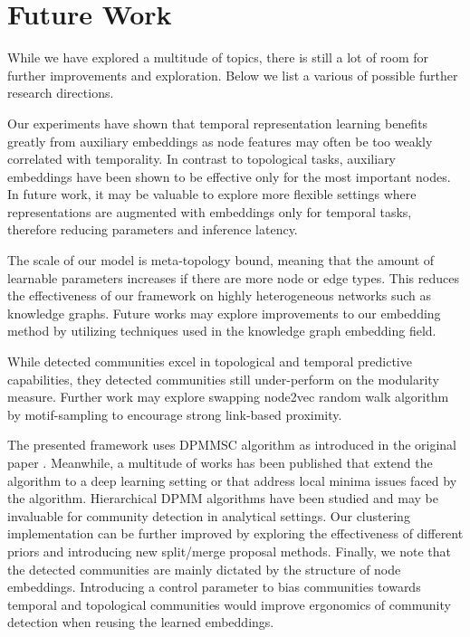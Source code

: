 \chapter{Future Work}
While we have explored a multitude of topics, there is still a lot of room for further improvements and exploration.
Below we list a various of possible further research directions.

Our experiments have shown that temporal representation learning benefits greatly from auxiliary embeddings as node features may often be too weakly correlated with temporality.
In contrast to topological tasks, auxiliary embeddings have been shown to be effective only for the most important nodes.
In future work, it may be valuable to explore more flexible settings where representations are augmented with embeddings only for temporal tasks, therefore reducing parameters and inference latency.

The scale of our model is meta-topology bound, meaning that the amount of learnable parameters increases if there are more node or edge types.
This reduces the effectiveness of our framework on highly heterogeneous networks such as knowledge graphs.
Future works may explore improvements to our embedding method by utilizing techniques used in the knowledge graph embedding field.

While detected communities excel in topological and temporal predictive capabilities, they detected communities still under-perform on the modularity measure.
Further work may explore swapping node2vec random walk algorithm by motif-sampling \cite{jiaCommunityGANCommunityDetection2019} to encourage strong link-based proximity.

The presented framework uses DPMMSC algorithm as introduced in the original paper \cite{changParallelSamplingDP2013a}. 
Meanwhile, a multitude of works has been published that extend the algorithm to a deep learning setting \cite{ronenDeepDPMDeepClustering2022} or that address local minima issues faced by the algorithm.
Hierarchical DPMM algorithms have been studied \cite{tehHierarchicalDirichletProcesses2006, changSamplingComputerVision} and may be invaluable for community detection in analytical settings.
Our clustering implementation can be further improved by exploring the effectiveness of different priors and introducing new split/merge proposal methods.
Finally, we note that the detected communities are mainly dictated by the structure of node embeddings.
Introducing a control parameter to bias communities towards temporal and topological communities would improve ergonomics of community detection when reusing the learned embeddings.


